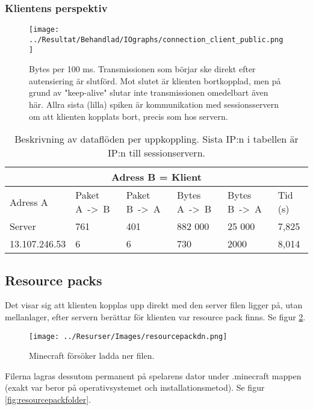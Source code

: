 \documentclass[journal,comsoc]{IEEEtran}
\begin{document}
\subsubsection{Klientens perspektiv}
\begin{figure} [H]
  \centering
  \texttt{[image: ../Resultat/Behandlad/IOgraphs/connection\_client\_public.png]}
  \caption{Bytes per 100 ms. Transmissionen som börjar ske direkt efter autensiering är slutförd. Mot slutet är klienten bortkopplad, men på grund av "keep-alive" slutar inte transmissionen omedelbart även här. Allra sista (lilla) spiken är kommunikation med sessionsservern om att klienten kopplats bort, precis som hos servern.}
  \label{fig:client:conn}
\end{figure}
\begin{table} [H]
  \begin{center}
    \label{table:client:conn}
    \begin{tabular}{ | m{1.5cm} |  m{1cm} | m{1cm}| m{1cm}|m{1cm}|m{0.5cm}| } 
      \hline
      \multicolumn{6}{|c|}{Adress B = Klient} \\
      \hline
      Adress A & Paket A~->~B & Paket B~->~A & Bytes A~->~B & Bytes B~->~A & Tid (s) \\
      \hline
      Server & 761 & 401 & 882 000 & 25 000 & 7,825 \\
      \hline
      13.107.246.53 & 6 & 6 & 730 & 2000 & 8,014 \\
      \hline 
    \end{tabular}
  \end{center}
  \caption{Beskrivning av dataflöden per uppkoppling. Sista IP:n i tabellen är IP:n till sessionservern.}
\end{table}
\subsection{Resource packs}
Det visar sig att klienten kopplas upp direkt med den server filen ligger på, utan mellanlager, efter servern berättar för klienten var resource pack finns. Se figur \ref{fig:resourcepackdn}.

\begin{figure} [H]
  \centering
  \texttt{[image: ../Resurser/Images/resourcepackdn.png]}
  \caption{Minecraft försöker ladda ner filen.}
  \label{fig:resourcepackdn}
\end{figure}

Filerna lagras dessutom permanent på spelarens dator under .minecraft mappen (exakt var beror på operativsystemet och installationsmetod). Se figur \ref{fig:resourcepackfolder}.
\end{document}
